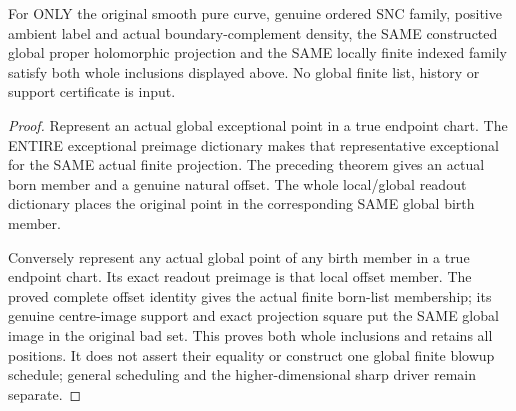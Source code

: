 \begin{theorem}
\label{hir:sharp-actual-original-global-exceptional-birth-support}
\leanok
For ONLY the original smooth pure curve, genuine ordered SNC family,
positive ambient label and actual boundary-complement density, the
SAME constructed global proper holomorphic projection and the SAME
locally finite indexed family satisfy both whole inclusions displayed
above. No global finite list, history or support certificate is input.
\end{theorem}
\begin{proof}
Represent an actual global exceptional point in a true endpoint chart.
The ENTIRE exceptional preimage dictionary makes that representative
exceptional for the SAME actual finite projection. The preceding
theorem gives an actual born member and a genuine natural offset.
The whole local/global readout dictionary places the original point
in the corresponding SAME global birth member.

Conversely represent any actual global point of any birth member in
a true endpoint chart. Its exact readout preimage is that local offset
member. The proved complete offset identity gives the actual finite
born-list membership; its genuine centre-image support and exact
projection square put the SAME global image in the original bad set.
This proves both whole inclusions and retains all positions. It does
not assert their equality or construct one global finite blowup
schedule; general scheduling and the higher-dimensional sharp driver
remain separate.
\end{proof}

